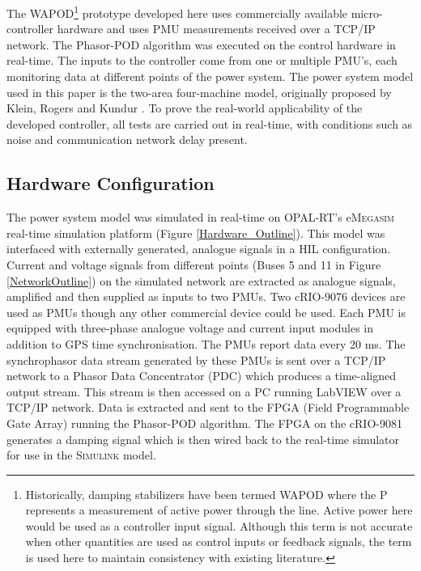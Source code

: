 \documentclass[journal]{IEEEtran}
\begin{document}
The WAPOD\footnote{Historically, damping stabilizers have been termed WAPOD where the P represents a measurement of active power through the line. Active power here would be used as a controller input signal. Although this term is not accurate when other quantities are used as control inputs or feedback signals, the term is used here to maintain consistency with existing literature.} prototype developed here uses commercially available micro-controller hardware and uses PMU measurements received over a TCP/IP network. The Phasor-POD algorithm \cite{PhasorPOD} was executed on the control hardware in real-time. The inputs to the controller come from one or multiple PMU's, each monitoring data at different points of the power system. The power system model used in this paper is the two-area four-machine model, originally proposed by Klein, Rogers and Kundur \cite{KundurTwoArea}. To prove the real-world applicability of the developed controller, all tests are carried out in real-time, with conditions such as noise and communication network delay present.

\subsection{Hardware Configuration}
The power system model was simulated in real-time on OPAL-RT's e\textsc{Megasim} \cite{eMEGASIM} real-time simulation platform (Figure \ref {Hardware_Outline}). This model was interfaced with externally generated, analogue signals in a HIL configuration. Current and voltage signals from different points (Buses 5 and 11 in Figure \ref{NetworkOutline}) on the simulated network are extracted as analogue signals, amplified and then supplied as inputs to two PMUs. Two cRIO-9076 \cite{cRIO9081} devices are used as PMUs though any other commercial device could be used. Each PMU is equipped with three-phase analogue voltage and current input modules in addition to GPS time synchronisation. The PMUs report data every 20 ms. The synchrophasor data stream  generated by these PMUs is sent over a TCP/IP network to a Phasor Data Concentrator (PDC) which produces a time-aligned output stream. This stream is then accessed on a PC running LabVIEW over a TCP/IP network. Data is extracted and sent to the FPGA (Field Programmable Gate Array) running the Phasor-POD algorithm. The FPGA on the cRIO-9081 \cite{cRIO9081} generates a damping signal which is then wired back to the real-time simulator for use in the \textsc{Simulink} model.
\end{document}
